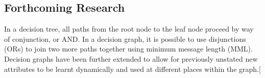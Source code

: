 \documentclass[a0,portrait]{a0poster}
\begin{document}
\begin{multicols}{3}

\section*{Forthcoming Research}

In a decision tree, all paths from the root node to the leaf node proceed by way of conjunction, or AND. In a decision graph, it is possible to use disjunctions (ORs) to join two more paths together using minimum message length (MML). Decision graphs have been further extended to allow for previously unstated new attributes to be learnt dynamically and used at different places within the graph.[


\nocite{*} %


\end{multicols}
\end{document}
